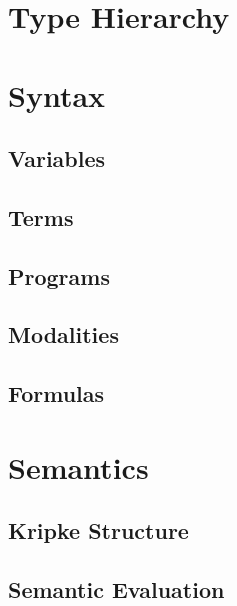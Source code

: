 \documentclass[a4paper, 11pt, accentcolor = tud3b]{tudreport}
\begin{document}
		\section{Type Hierarchy} %

		\section{Syntax} %

			\subsection{Variables} %

			\subsection{Terms} %

			\subsection{Programs} %

			\subsection{Modalities} %

			\subsection{Formulas} %

		\section{Semantics} %

			\subsection{Kripke Structure} %

			\subsection{Semantic Evaluation} %
\end{document}
